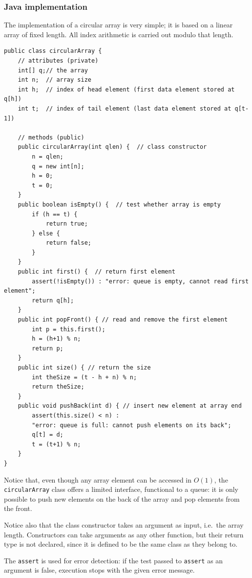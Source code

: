 \documentclass[a4paper]{book}
\theoremstyle{changebreak}                %
\begin{document}
\subsubsection{Java implementation}
The implementation of a circular
array is very simple; it is based
on a linear array of fixed length. All index arithmetic is carried
out modulo that length. 
{\small
\begin{verbatim}
public class circularArray {
    // attributes (private)
    int[] q;// the array
    int n;  // array size    
    int h;  // index of head element (first data element stored at q[h])
    int t;  // index of tail element (last data element stored at q[t-1])

    // methods (public)
    public circularArray(int qlen) {  // class constructor
        n = qlen;
        q = new int[n];
        h = 0;
        t = 0;
    }
    public boolean isEmpty() {  // test whether array is empty
        if (h == t) {
            return true;
        } else {
            return false;
        }
    }
    public int first() {  // return first element
        assert(!isEmpty()) : "error: queue is empty, cannot read first element";
        return q[h];
    }
    public int popFront() { // read and remove the first element
        int p = this.first();
        h = (h+1) % n;
        return p;
    }
    public int size() { // return the size 
        int theSize = (t - h + n) % n;
        return theSize;
    }
    public void pushBack(int d) { // insert new element at array end
        assert(this.size() < n) : 
        "error: queue is full: cannot push elements on its back";
        q[t] = d;
        t = (t+1) % n;  
    }
}
\end{verbatim}
} Notice that, even though any array element can be
accessed in $O(1)$, the {\tt
  circularArray} class offers a limited
interface, functional to a queue: it is
only possible to push new elements on the back of the array and pop
elements from the front. 

Notice also that the class constructor takes an argument as input,
i.e.~the array length. Constructors can take arguments as any other
function, but their return type is not declared, since it is defined
to be the same class as they belong to.

The {\tt assert} is used for error
detection: if the test passed to {\tt assert}
as an argument is false, execution stops with the given error message.
\end{document}
